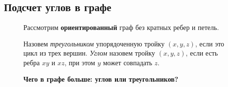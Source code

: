 \newpage %
\subsection{Подсчет углов в графе}

\begin{figure}[h!]
    \begin{minipage}{0.7\textwidth}
        Рассмотрим \textbf{ориентированный} граф без кратных ребер и петель.
        
        Назовем \textit{треугольником} упорядоченную тройку $ (x, y, z)$, если это цикл из трех вершин. \textit{Углом} назовем тройку  $ (x, y, z)$, если есть ребра  $ xy$ и $xz$, при этом  $ y $ может совпадать  $ z$.
        
        \textbf{Чего в графе больше: углов или треугольников?}
    \end{minipage}
	\hfill
	\begin{minipage}{0.25\textwidth}
	\end{minipage}
\end{figure}

